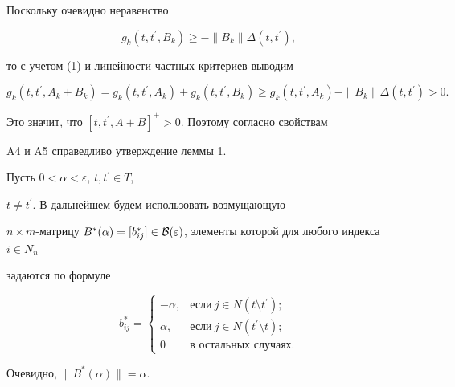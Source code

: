 \begin{pf}


Поскольку очевидно неравенство


$$


g_k(t,t^{\prime},B_k) \geq -\|B_k\|\Delta(t,t^{\prime}),


$$


то с учетом (1) и линейности частных критериев выводим


$$


g_k(t,t^{\prime},A_k+B_k)=g_k(t,t^{\prime},A_k)+g_k(t,t^{\prime},B_k)


\geq g_k(t,t^{\prime},A_k)-\|B_k\|\Delta(t,t^{\prime})>0.


$$


Это значит, что $[t,t^{\prime},A+B]^+>0$. Поэтому согласно свойствам


A4 и A5 справедливо утверждение леммы 1.


\end{pf}





Пусть $0<\alpha < \varepsilon$, $t,t^{\prime}\in T$,


$t\neq t^{\prime}$. В дальнейшем будем использовать возмущающую


$n\times m$-мат\-ри\-цу $B^*(\alpha)=[b_{ij}^*]\in {\cal


B}(\varepsilon)$, элементы которой для любого индекса $i\in N_n$


задаются по формуле 


\begin{equation} 


b_{ij}^*=


\begin{cases}


-\alpha, & \text{если}\  j\in N(t\setminus t^{\prime});\\


 \alpha, & \text{если}\  j\in N(t^{\prime}\setminus t);\\


0 & \text{в остальных случаях.}


\end{cases}


\end{equation}


Очевидно, $\|B^*(\alpha)\|=\alpha$.





